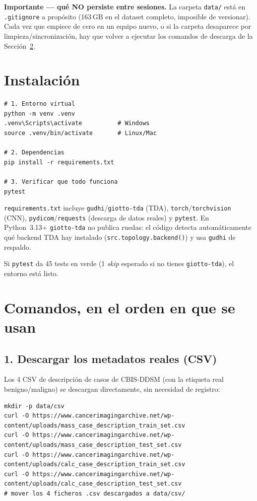 \documentclass[11pt,a4paper]{article}
\begin{document}
\textbf{Importante — qué NO persiste entre sesiones.} La carpeta \texttt{data/}
está en \texttt{.gitignore} a propósito (163\,GB en el dataset completo,
imposible de versionar). Cada vez que empiece de cero en un equipo nuevo, o si
la carpeta desaparece por limpieza/sincronización, hay que volver a ejecutar
los comandos de descarga de la Sección~\ref{sec:comandos}.

\section{Instalación}

\begin{lstlisting}
# 1. Entorno virtual
python -m venv .venv
.venv\Scripts\activate          # Windows
source .venv/bin/activate       # Linux/Mac

# 2. Dependencias
pip install -r requirements.txt

# 3. Verificar que todo funciona
pytest
\end{lstlisting}

\texttt{requirements.txt} incluye \texttt{gudhi}/\texttt{giotto-tda} (TDA),
\texttt{torch}/\texttt{torchvision} (CNN), \texttt{pydicom}/\texttt{requests}
(descarga de datos reales) y \texttt{pytest}. En Python~3.13+ \texttt{giotto-tda}
no publica ruedas: el código detecta automáticamente qué backend TDA hay
instalado (\texttt{src.topology.backend()}) y usa \texttt{gudhi} de respaldo.

Si \texttt{pytest} da 45 tests en verde (1 \textit{skip} esperado si no tienes
\texttt{giotto-tda}), el entorno está listo.

\section{Comandos, en el orden en que se usan}
\label{sec:comandos}

\subsection{1. Descargar los metadatos reales (CSV)}

Los 4 CSV de descripción de casos de CBIS-DDSM (con la etiqueta real
benigno/maligno) se descargan directamente, sin necesidad de registro:

\begin{lstlisting}
mkdir -p data/csv
curl -O https://www.cancerimagingarchive.net/wp-content/uploads/mass_case_description_train_set.csv
curl -O https://www.cancerimagingarchive.net/wp-content/uploads/mass_case_description_test_set.csv
curl -O https://www.cancerimagingarchive.net/wp-content/uploads/calc_case_description_train_set.csv
curl -O https://www.cancerimagingarchive.net/wp-content/uploads/calc_case_description_test_set.csv
# mover los 4 ficheros .csv descargados a data/csv/
\end{lstlisting}
\end{document}
